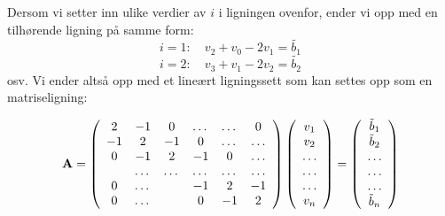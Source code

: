 \documentclass{article}
\begin{document}
Dersom vi setter inn ulike verdier av $i$ i ligningen ovenfor, ender vi opp med en tilhørende ligning på samme form:
\[i=1: \quad v_2 + v_0 - 2v_1 = \tilde{b_1}\]
\[i=2: \quad v_3 + v_1 -2v_2 = \tilde{b_2}\]
osv.
Vi ender altså opp med et lineært ligningssett som kan settes opp som en matriseligning:

\begin{equation}
    {\bf A} = \left(\begin{array}{cccccc}
                           2& -1& 0 &\dots   & \dots &0 \\
                           -1 & 2 & -1 &0 &\dots &\dots \\
                           0&-1 &2 & -1 & 0 & \dots \\
                           & \dots   & \dots &\dots   &\dots & \dots \\
                           0&\dots   &  &-1 &2& -1 \\
                           0&\dots    &  & 0  &-1 & 2 \\
                      \end{array} \right)\left(\begin{array}{c}
                           v_1\\
                           v_2\\
                           \dots \\
                          \dots  \\
                          \dots \\
                           v_n\\
                      \end{array} \right)
  =\left(\begin{array}{c}
                           \tilde{b}_1\\
                           \tilde{b}_2\\
                           \dots \\
                           \dots \\
                          \dots \\
                           \tilde{b}_n\\
                      \end{array} \right)
\end{equation}
\end{document}
